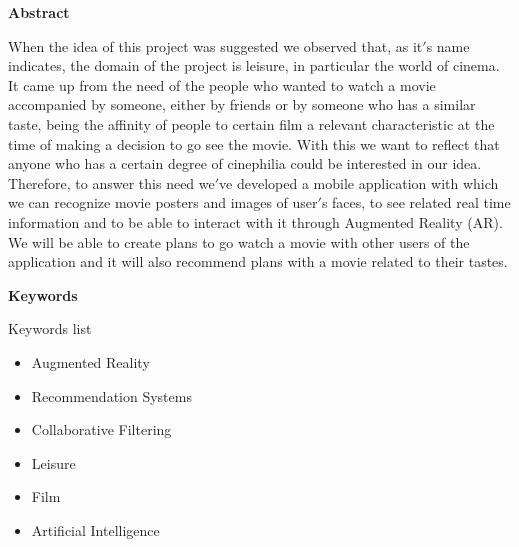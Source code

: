 
\newpage

\thispagestyle{empty}

\begin{center}

{\bf \Huge Abstract}

  \end{center}
\vspace{1cm}

When the idea of this project was suggested we observed that, as it$'$s name indicates, the
domain of the project is leisure, in particular the world of cinema. It came up from the need of 
the people who wanted to watch a movie accompanied by someone, either by friends or by someone who has
a similar taste, being the affinity of people to certain film a relevant characteristic at the time of making
a decision to go see the movie. With this we want to reflect that anyone who has a certain degree of cinephilia could be interested
in our idea. Therefore, to answer this need we$'$ve developed a mobile application with which we can recognize movie
posters and images of user$'$s faces, to see related real time information and to be able to interact with it through 
Augmented Reality (AR). We will be able to create plans to go watch a movie with other users of the application and it 
will also recommend plans with a movie related to their tastes.

\vspace{1cm}

\begin{center}

  {\bf \Large Keywords}
  
     \end{center}
  
     \vspace{0.5cm}
     
     Keywords list
     \begin{itemize}  
      \item Augmented Reality
      \item Recommendation Systems
      \item Collaborative Filtering
      \item Leisure
      \item Film
      \item Artificial Intelligence
    \end{itemize}
   


